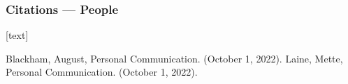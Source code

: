 \documentclass{beamer}
\begin{document}
\begin{frame}
	\frametitle{Citations --- People}
	[text]
	\begin{thebibliography}{2}
		 Blackham, August, Personal Communication. (October 1, 2022).
		 Laine, Mette, Personal Communication. (October 1, 2022).
	\end{thebibliography}
\end{frame}
\end{document}

